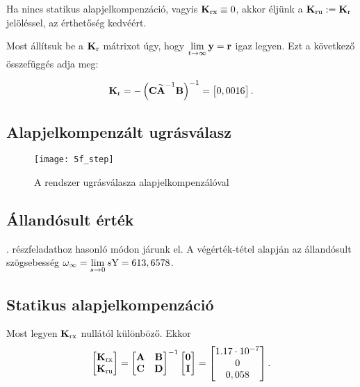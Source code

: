 Ha nincs statikus alapjelkompenzáció, vagyis $\boldsymbol{\mathrm{K}}_\text{rx}\equiv0$, akkor éljünk
a $\boldsymbol{\mathrm{K}}_\text{ru}:=\boldsymbol{\mathrm{K}}_\text{r}$ jelöléssel, az érthetőség kedvéért.

Most állítsuk be a $\boldsymbol{\mathrm{K}}_\text{r}$ mátrixot úgy, hogy
$\lim\limits_{t\rightarrow\infty}\boldsymbol{\mathrm{y}}=\boldsymbol{\mathrm{r}}$ igaz legyen.
Ezt a következő összefüggés adja meg:

\begin{equation}
	\boldsymbol{\mathrm{K}}_\text{r} = -\left(\boldsymbol{\mathrm{C}}\widetilde{\boldsymbol{\mathrm{A}}}^{-1}\boldsymbol{\mathrm{B}}\right)^{-1} = \begin{bmatrix}0,0016\end{bmatrix}.
\end{equation}


\subsection{Alapjelkompenzált ugrásválasz}

\begin{figure}[H]
	\centering
	\texttt{[image: 5f\_step]}
	\caption{A rendszer ugrásválasza alapjelkompenzálóval}
	\label{fig:5f_step}
\end{figure}


\subsection{Állandósult érték}

. részfeladathoz hasonló módon járunk el.
A végérték-tétel alapján az állandósult szögsebesség $\omega_\infty = \lim\limits_{s\rightarrow 0}s\mathrm{Y} = 613,6578$.


\subsection{Statikus alapjelkompenzáció}

Most legyen $\boldsymbol{\mathrm{K}}_\text{rx}$ nullától különböző.
Ekkor
\begin{equation}
	\begin{bmatrix}\boldsymbol{\mathrm{K}}_\text{rx}\\\boldsymbol{\mathrm{K}}_\text{ru}\end{bmatrix}=\begin{bmatrix}\boldsymbol{\mathrm{A}}&\boldsymbol{\mathrm{B}}\\\boldsymbol{\mathrm{C}}&\boldsymbol{\mathrm{D}}\end{bmatrix}^{-1}\begin{bmatrix}\boldsymbol{\mathrm{0}}\\\boldsymbol{\mathrm{I}}\end{bmatrix}
	= \begin{bmatrix}1.17\cdot 10^{-7}\\0\\0,058\end{bmatrix}.
\end{equation}

